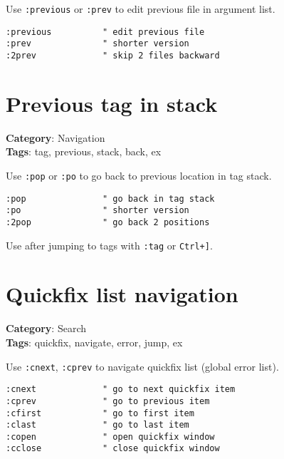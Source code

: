 {{{{{{Use {\footnotesize \Verb§:previous§} or {\footnotesize \Verb§:prev§} to edit previous file in argument list.

\begin{Exa*}{}
\begin{Verbatim}[fontsize=\footnotesize, breaklines, breakanywhere]
:previous          " edit previous file  
:prev              " shorter version
:2prev             " skip 2 files backward
\end{Verbatim}
\end{Exa*}

\section{Previous tag in stack}

\textbf{Category}: Navigation\\ \textbf{Tags}: tag, previous, stack, back, ex
\vspace{0.5cm}

Use {\footnotesize \Verb§:pop§} or {\footnotesize \Verb§:po§} to go back to previous location in tag stack.

\begin{Exa*}{}
\begin{Verbatim}[fontsize=\footnotesize, breaklines, breakanywhere]
:pop               " go back in tag stack
:po                " shorter version
:2pop              " go back 2 positions
\end{Verbatim}
\end{Exa*}

Use after jumping to tags with {\footnotesize \Verb§:tag§} or {\footnotesize \Verb§Ctrl+]§}.

\section{Quickfix list navigation}

\textbf{Category}: Search\\ \textbf{Tags}: quickfix, navigate, error, jump, ex
\vspace{0.5cm}

Use {\footnotesize \Verb§:cnext§}, {\footnotesize \Verb§:cprev§} to navigate quickfix list (global error list).

\begin{Exa*}{}
\begin{Verbatim}[fontsize=\footnotesize, breaklines, breakanywhere]
:cnext             " go to next quickfix item
:cprev             " go to previous item  
:cfirst            " go to first item
:clast             " go to last item
:copen             " open quickfix window
:cclose            " close quickfix window
\end{Verbatim}
\end{Exa*}

}}}}}}

